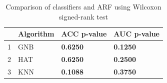 \begin{table}
\footnotesize
\caption{Comparison of classifiers and ARF using Wilcoxon signed-rank test}
\label{tab:wilcoxon comparison}
\begin{tabular}{llll}
\hline
 & Algorithm & ACC p-value & AUC p-value \\
\hline
1 & GNB & \textbf{0.6250} & \textbf{0.1250} \\
2 & HAT & \textbf{0.6250} & \textbf{0.2500} \\
3 & KNN & \textbf{0.1088} & \textbf{0.3750} \\
\hline
\end{tabular}
\end{table}
